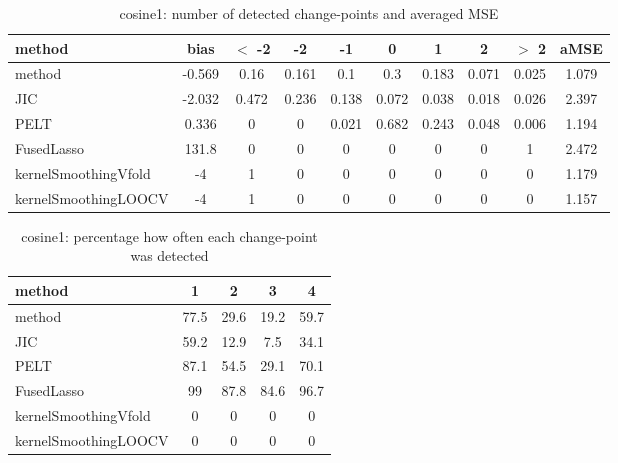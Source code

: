 \begin{table}[ht]
\centering
\begin{tabular}{l|c|ccccccc|c}
  \hline
method & bias & $<$ -2 & -2 & -1 & 0 & 1 & 2 & $>$ 2 & aMSE \\ 
  \hline
method & -0.569 &  0.16 & 0.161 &   0.1 &   0.3 & 0.183 & 0.071 & 0.025 & 1.079 \\ 
  JIC & -2.032 & 0.472 & 0.236 & 0.138 & 0.072 & 0.038 & 0.018 & 0.026 & 2.397 \\ 
  PELT & 0.336 &     0 &     0 & 0.021 & 0.682 & 0.243 & 0.048 & 0.006 & 1.194 \\ 
  FusedLasso & 131.8 &     0 &     0 &     0 &     0 &     0 &     0 &     1 & 2.472 \\ 
  kernelSmoothingVfold &    -4 &     1 &     0 &     0 &     0 &     0 &     0 &     0 & 1.179 \\ 
  kernelSmoothingLOOCV &    -4 &     1 &     0 &     0 &     0 &     0 &     0 &     0 & 1.157 \\ 
   \hline
\end{tabular}
\caption{cosine1: number of detected change-points and averaged MSE} 
\label{tab:cosine1Njumps}
\end{table}
\begin{table}[ht]
\centering
\begin{tabular}{l|cccc}
  \hline
method & 1 & 2 & 3 & 4 \\ 
  \hline
method &   77.5 &   29.6 &   19.2 &   59.7 \\ 
  JIC &   59.2 &   12.9 &    7.5 &   34.1 \\ 
  PELT &   87.1 &   54.5 &   29.1 &   70.1 \\ 
  FusedLasso &     99 &   87.8 &   84.6 &   96.7 \\ 
  kernelSmoothingVfold &      0 &      0 &      0 &      0 \\ 
  kernelSmoothingLOOCV &      0 &      0 &      0 &      0 \\ 
   \hline
\end{tabular}
\caption{cosine1: percentage how often each change-point was detected} 
\label{tab:cosine1Detections}
\end{table}
